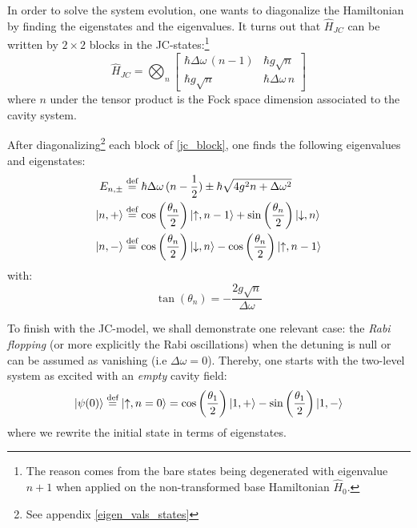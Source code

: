 \documentclass[11pt]{report}
\DeclarePairedDelimiter\ket{\lvert}{\rangle}
\begin{document}
In order to solve the system evolution, one wants to diagonalize the Hamiltonian by finding the eigenstates and the eigenvalues. It turns out that $\hat{H}_{JC}$ can be written by $2\times 2$ blocks in the JC-states:\footnote{The reason comes from the bare states being degenerated with eigenvalue $n+1$ when applied on the non-transformed base Hamiltonian $\hat{H}_0$.}
\begin{equation}
\label{jc_block}
\hat{H}_{JC} = \bigotimes_n \begin{bmatrix}
\hbar \Delta\omega \, (n-1) & \hbar g \sqrt{n}\\
\hbar g \sqrt{n} & \hbar \Delta\omega \, n
\end{bmatrix}
\end{equation}
where $n$ under the tensor product is the Fock space dimension associated to the cavity system.

After diagonalizing\footnote{See appendix \ref{eigen_vals_states}} each block of \eqref{jc_block}, one finds the following eigenvalues and eigenstates:
\begin{align}
\label{jc_eigens}
E_{n, \pm} &\stackrel{\text{def}}{=} \hbar\Delta\omega\,(n-\frac{1}{2}) \pm \hbar\sqrt{4g^2n + \Delta\omega ^2}\\
\ket{n, +} &\stackrel{\text{def}}{=} \cos\left(\frac{\theta_n}{2}\right) \ket{\uparrow, n - 1}  + \sin\left(\frac{\theta_n}{2}\right) \ket{\downarrow, n}\\
\ket{n, -} &\stackrel{\text{def}}{=} \cos\left(\frac{\theta_n}{2}\right) \ket{\downarrow, n}  - \cos\left(\frac{\theta_n}{2}\right) \ket{\uparrow, n - 1}
\end{align}
with:
\begin{equation}
\label{tan_theta_n}
\tan\left(\theta_n\right) = -\frac{2g\sqrt{n}}{\Delta\omega}
\end{equation}

To finish with the JC-model, we shall demonstrate one relevant case: the \textit{Rabi flopping} (or more explicitly the Rabi oscillations) when the detuning is null or can be assumed as vanishing (i.e $\Delta\omega = 0$). Thereby, one starts with the two-level system as excited with an \textit{empty} cavity field:
\begin{equation}
\ket{\psi(0)} \stackrel{\text{def}}{=} \ket{\uparrow, n = 0} = \cos\left(\frac{\theta_{1}}{2}\right) \ket{1, +} - \sin\left(\frac{\theta_{1}}{2}\right) \ket{1, -}
\end{equation}
where we rewrite the initial state in terms of eigenstates.
\end{document}
